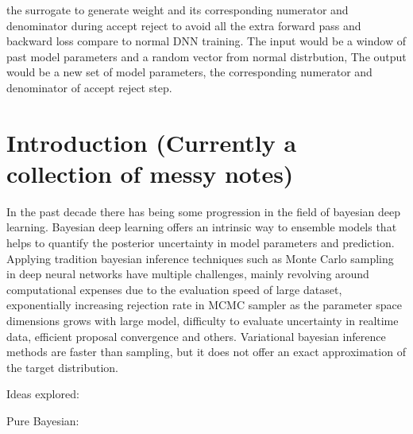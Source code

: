 \documentclass[honours,12pt]{unswthesis}
\newcommand\blankpage{%
    \null
    \thispagestyle{empty}%
    \addtocounter{page}{-1}%
    \newpage}
\numberwithin{equation}{section}
\begin{document}
the surrogate to generate weight and its corresponding numerator and denominator during accept reject to avoid all the extra forward pass and backward loss compare to normal DNN training. The input would be a window of past model parameters and a random vector from normal distrbution, The output would be a new set of model parameters, the corresponding numerator and denominator of accept reject step.

\afterpage{\blankpage}


\afterpreface

%
%

\afterpage{\blankpage}

\chapter{Introduction (Currently a collection of messy notes)}\label{intro}

In the past decade there has being some progression in the field of bayesian deep learning. Bayesian deep learning offers an intrinsic way to ensemble models that helps to quantify the posterior uncertainty in model parameters and prediction. Applying tradition bayesian inference techniques such as Monte Carlo sampling in deep neural networks have multiple challenges, mainly revolving around computational expenses due to the evaluation speed of large dataset, exponentially increasing rejection rate in MCMC sampler as the parameter space dimensions grows with large model, difficulty to evaluate uncertainty in realtime data, efficient proposal convergence and others. Variational bayesian inference methods are faster than sampling, but it does not offer an exact approximation of the target distribution. 



\noindent Ideas explored: 

Pure Bayesian:
\end{document}
